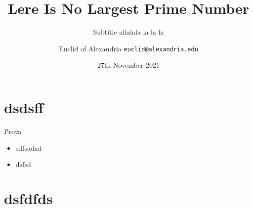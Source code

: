 \documentclass{beamer}
\title{Lere Is No Largest Prime Number}
\subtitle{Subtitle allalala la la la}
\date{27th November 2021}
\author[Euclid]{Euclid of Alexandria \texttt{euclid@alexandria.edu}}
\begin{document}
\begin{frame}
\titlepage
\end{frame}
\section{dsdsff}

\begin{frame}{Prova}
	\begin{itemize}
		\item sdfsadad
		\item dsfsd
	\end{itemize}
\end{frame}

\section{dsfdfds}

\begin{frame}
	\tableofcontents
\end{frame}
\end{document}
